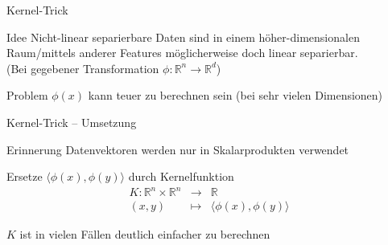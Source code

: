 \documentclass[xcolor={dvipsnames,svgnames},draft]{beamer}
\newcommand{\inner}[2]{\langle{} #1, #2 \rangle{}}
\begin{document}
\begin{frame}{Kernel-Trick}
  \begin{block}{Idee}
    Nicht-linear separierbare Daten sind in einem höher-dimensionalen
    Raum/mittels anderer Features möglicherweise doch linear separierbar. \\
    (Bei gegebener Transformation $\phi : \mathbb{R}^n \to \mathbb{R}^d$)
  \end{block}

  \begin{alertblock}{Problem}
    $\phi(x)$ kann teuer zu berechnen sein (bei sehr vielen Dimensionen)
  \end{alertblock}
\end{frame}

\begin{frame}{Kernel-Trick -- Umsetzung}
  \begin{block}{Erinnerung}
    Datenvektoren werden nur in Skalarprodukten verwendet
  \end{block}

  Ersetze $\inner{\phi(x)}{\phi(y)}$ durch Kernelfunktion
  \[
    \begin{array}{rcl}
      K : \mathbb{R}^n \times \mathbb{R}^n & \to & \mathbb{R} \\
      (x,y) & \mapsto & \inner{\phi(x)}{\phi(y)}
    \end{array}
  \]

  $K$ ist in vielen Fällen deutlich einfacher zu berechnen
\end{frame}
\end{document}
